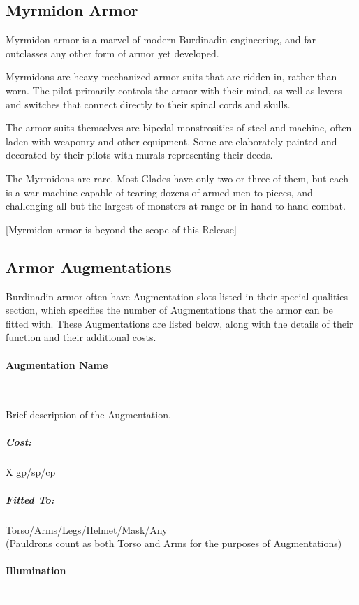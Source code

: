 \documentclass[oneside,11pt,english]{book}
\begin{document}
\clearpage
\subsection{Myrmidon Armor}
Myrmidon armor is a marvel of modern Burdinadin engineering, and far outclasses any other form of 
armor yet developed.

Myrmidons are heavy mechanized armor suits that are ridden in, rather than worn. The pilot primarily 
controls the armor with their mind, as well as levers and switches that connect directly to their spinal 
cords and skulls.

The armor suits themselves are bipedal monstrosities of steel and machine, often laden with weaponry 
and other equipment. Some are elaborately painted and decorated by their pilots with murals representing 
their deeds.

The Myrmidons are rare. Most Glades have only two or three of them, but each is a war machine capable 
of tearing dozens of armed men to pieces, and challenging all but the largest of monsters at range or in 
hand to hand combat. 

[Myrmidon armor is beyond the scope of this Release] 

\subsection{Armor Augmentations}
Burdinadin armor often have Augmentation slots listed in their special qualities section, which specifies 
the number of Augmentations that the armor can be fitted with. These Augmentations are listed below,
along with the details of their function and their additional costs.

\paragraph{Augmentation Name}---

Brief description of the Augmentation.
\vspace{-15pt}\subparagraph{Cost:} X gp/sp/cp
\vspace{-15pt}\subparagraph{Fitted To:} Torso/Arms/Legs/Helmet/Mask/Any\\ (Pauldrons count as both Torso and Arms for the purposes of Augmentations)

\paragraph{Illumination}---\quad[0]
\end{document}
